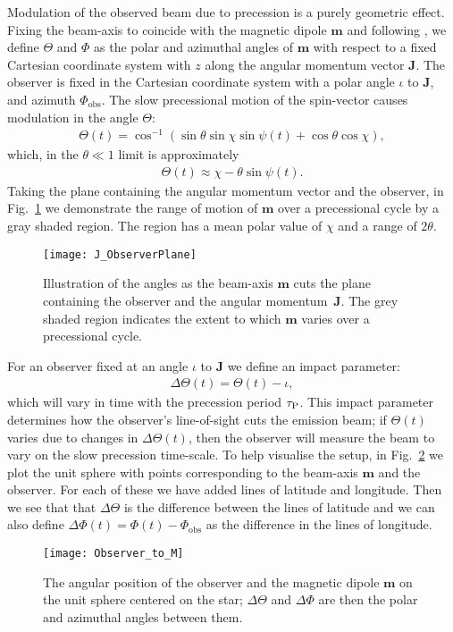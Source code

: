 \documentclass[../full_thesis/full_thesis.tex]{subfiles}
\newcommand{\PhiO}{\Phi_{\mathrm{obs}}}
\begin{document}
Modulation of the observed beam due to precession is a purely geometric effect.
Fixing the beam-axis to coincide with the magnetic dipole $\mathbf{m}$ and
following \citet{Jones2001}, we define $\Theta$ and $\Phi$ as the polar and
azimuthal angles of $\mathbf{m}$ with respect to a fixed Cartesian coordinate
system with $z$ along the angular momentum vector $\textbf{J}$. The observer is
fixed in the Cartesian coordinate system with a polar angle $\iota$ to $\textbf{J}$, and
azimuth $\PhiO$. The slow precessional motion of the spin-vector causes modulation
in the angle $\Theta$:
\begin{align}
\Theta(t) = \cos^{-1}\left(\sin\theta\sin\chi\sin\psi(t) + \cos\theta\cos\chi\right),
\label{eqn: Theta}
\end{align}
which, in the $\theta \ll 1$ limit is approximately
\begin{align}
\Theta(t) \approx \chi - \theta \sin\psi(t).
\end{align}
Taking the plane containing the angular momentum vector and the observer, in
Fig.~\ref{fig: J observer plane} we demonstrate the range of motion of
$\mathbf{m}$ over a precessional cycle by a gray shaded region.  The region has
a mean polar value of $\chi$ and a range of $2\theta$.
\begin{figure}
\centering \texttt{[image: J\_ObserverPlane]}
\caption{Illustration of the angles as the beam-axis $\mathbf{m}$ cuts the
         plane containing the observer and the angular momentum~$\mathbf{J}$.
         The grey shaded region indicates the extent to which $\mathbf{m}$
         varies over a precessional cycle.}
\label{fig: J observer plane}
\end{figure}


For an observer fixed at an angle $\iota$ to $\textbf{J}$ we define an impact parameter:
\begin{align}
\label{eqn:Delta_Theta_definition}
\Delta\Theta(t) = \Theta(t) - \iota ,
\end{align}
which will vary in time with the precession period $\tau_{\mathrm{P}}$.  This impact
parameter determines how the observer's line-of-sight cuts the emission beam;
if $\Theta(t)$ varies due to changes in $\Delta\Theta(t)$, then the observer
will measure the beam to vary on the slow precession time-scale. To help visualise the setup, in
Fig.~\ref{fig: delta theta delta phi} we plot the unit sphere with points
corresponding to the beam-axis $\mathbf{m}$ and the observer. For each of these
we have added lines of latitude and longitude. Then we see that that
$\Delta\Theta$ is the difference between the lines of latitude and we can also
define $\Delta\Phi(t) = \Phi(t) - \Phi_{\textrm{obs}}$ as the difference in the
lines of longitude.
\begin{figure}
\centering
\texttt{[image: Observer\_to\_M]}
\caption{The angular position of the observer and the magnetic dipole
         $\mathbf{m}$ on the unit sphere centered on the star; $\Delta\Theta$
         and $\Delta\Phi$ are then the polar and azimuthal angles between
         them.}
\label{fig: delta theta delta phi}
\end{figure}
\end{document}
